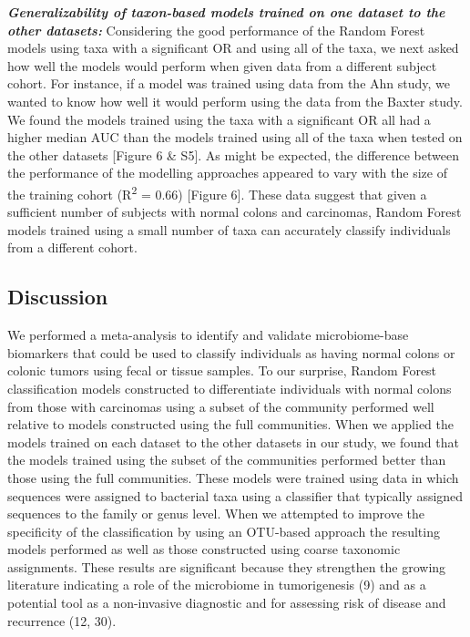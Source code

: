 \documentclass[12pt,]{article}
\begin{document}
\textbf{\emph{Generalizability of taxon-based models trained on one
dataset to the other datasets:}} Considering the good performance of the
Random Forest models using taxa with a significant OR and using all of
the taxa, we next asked how well the models would perform when given
data from a different subject cohort. For instance, if a model was
trained using data from the Ahn study, we wanted to know how well it
would perform using the data from the Baxter study. We found the models
trained using the taxa with a significant OR all had a higher median AUC
than the models trained using all of the taxa when tested on the other
datasets {[}Figure 6 \& S5{]}. As might be expected, the difference
between the performance of the modelling approaches appeared to vary
with the size of the training cohort (R\textsuperscript{2} = 0.66)
{[}Figure 6{]}. These data suggest that given a sufficient number of
subjects with normal colons and carcinomas, Random Forest models trained
using a small number of taxa can accurately classify individuals from a
different cohort.

\newpage

\subsection{Discussion}\label{discussion}

We performed a meta-analysis to identify and validate microbiome-base
biomarkers that could be used to classify individuals as having normal
colons or colonic tumors using fecal or tissue samples. To our surprise,
Random Forest classification models constructed to differentiate
individuals with normal colons from those with carcinomas using a subset
of the community performed well relative to models constructed using the
full communities. When we applied the models trained on each dataset to
the other datasets in our study, we found that the models trained using
the subset of the communities performed better than those using the full
communities. These models were trained using data in which sequences
were assigned to bacterial taxa using a classifier that typically
assigned sequences to the family or genus level. When we attempted to
improve the specificity of the classification by using an OTU-based
approach the resulting models performed as well as those constructed
using coarse taxonomic assignments. These results are significant
because they strengthen the growing literature indicating a role of the
microbiome in tumorigenesis (9) and as a potential tool as a
non-invasive diagnostic and for assessing risk of disease and recurrence
(12, 30).
\end{document}
